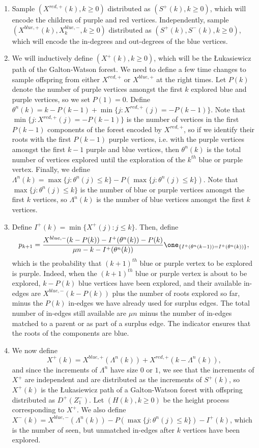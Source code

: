 \begin{enumerate}
\item Sample $(X^{red,+}(k),k\geq 0)$ distributed as $(S^+(k),k\geq 0)$, which will encode the children of purple and red vertices. Independently, sample $(X^{blue,+}(k), X^{blue,-}_k,k\geq 0)$ distributed as $(S^+(k), S^-(k),k\geq 0)$, which will encode the in-degrees and out-degrees of the blue vertices. 
\item We will inductively define $(X^+(k), k\geq 0)$, which will be the \L ukasiewicz path of the Galton-Watson forest. We need to define a few time changes to sample offspring from either $X^{red,+}$ or $X^{blue,+}$ at the right times. Let $P(k)$ denote the number of purple vertices amongst the first $k$ explored blue and purple vertices, so we set $P(1)=0$. Define $\theta^{n}(k)=k-P(k-1)+\min\{j: X^{red,+}(j)=-P(k-1)\}$.  Note that $\min\{j: X^{red,+}(j)=-P(k-1)\}$ is the number of vertices in the first $P(k-1)$ components of the forest encoded by $X^{red,+}$, so if we identify their roots with the first $P(k-1)$ purple vertices, i.e. with the purple vertices amongst the first $k-1$ purple and blue vertices, then $\theta^{n}(k)$ is the total number of vertices explored until the exploration of the $k^{th}$ blue or purple vertex. Finally, we define $\Lambda^n(k)=\max\{j:\theta^{n}(j)\leq k\}-P(\max\{j:\theta^{n}(j)\leq k\})$. Note that $\max\{j:\theta^{n}(j)\leq k\}$ is the number of blue or purple vertices amongst the first $k$ vertices, so $\Lambda^n(k)$ is the number of blue vertices amongst the first $k$ vertices.
\item Define $I^+(k)=\min\{X^+(j) : j\leq k\}$.  Then, define 
$$p_{k+1}=\frac{X^{blue,-}(k-P(k))-I^+(\theta^{n}(k))-P(k)}{\mu n-k-I^+(\theta^{n}(k))}\one_{\left\{I^+(\theta^n(k-1))= I^+(\theta^n(k))\right\}},$$ which is the probability that $(k+1)^{th}$ blue or purple vertex to be explored is purple. Indeed, when the $(k+1)^{th}$ blue or purple vertex is about to be explored, $k-P(k)$ blue vertices have been explored, and their available in-edges are $X^{blue,-}(k-P(k))$ plus the number of roots explored so far, minus the $P(k)$ in-edges we have already used for surplus edges. The total number of in-edges still available are $\mu n$ minus the number of in-edges matched to a parent or as part of a surplus edge. The indicator ensures that the roots of the components are blue.
\item We now define \begin{equation}\label{eq.definitionX^+}X^+(k)=X^{blue,+}(\Lambda^n(k))+X^{red,+}(k-\Lambda^n(k)),\end{equation} and since the increments of $\Lambda^n$ have size $0$ or $1$, we see that the increments of $X^+$ are independent and are distributed as the increments of $S^+(k)$, so $X^+(k)$ is the \L ukasiewicz path of a Galton-Watson forest with offspring distributed as $D^+(Z^-_1)$. Let $(H(k),k\geq 0)$ be the height process corresponding to $X^+$. We also define $X^-(k)=X^{blue,-}(\Lambda^n(k))-P(\max\{j:\theta^{n}(j)\leq k\})-I^+(k)$, which is the number of seen, but unmatched in-edges after $k$ vertices have been explored. 

\end{enumerate}
